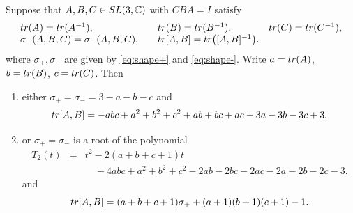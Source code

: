 \documentclass[10pt,a4paper]{amsart}
\begin{document}
\begin{theorem}\label{thm:branch-fact}
Suppose that $A,B,C\in{\rm SL}(3,{\mathbb C})$ with $CBA=I$ satisfy
$$
\begin{array}{lll}
{\rm tr}(A)={\rm tr}(A^{-1}),\quad & {\rm tr}(B)={\rm tr}(B^{-1}),\quad &{\rm tr}(C)={\rm tr}(C^{-1}),\\
\sigma_+(A,B,C)=\sigma_-(A,B,C),\quad & {\rm tr}[A,B]={\rm tr}\bigl([A,B]^{-1}\bigr). &
\end{array}
$$
where $\sigma_+,\sigma_-$ are given by \eqref{eq:shape+} and \eqref{eq:shape-}. 
Write $a={\rm tr}(A)$, $b={\rm tr}(B)$, $c={\rm tr}(C)$. Then 
\begin{enumerate}
\item[(1)] either $\sigma_+=\sigma_- = 3-a-b-c$
and
$$
{\rm tr}[A,B] = -abc+a^2+b^2+c^2+ab+bc+ac -3a-3b-3c+3.
$$
\item[(2)] or $\sigma_+=\sigma_-$ is a root of the polynomial
\begin{eqnarray*}
T_2(t) & = & t^2-2(a+b+c+1)t \\
&& \quad -4abc+a^2+b^2+c^2-2ab-2bc-2ac-2a-2b-2c-3.
\end{eqnarray*}
and
$$
{\rm tr}[A,B] = (a+b+c+1)\sigma_++(a+1)(b+1)(c+1)-1.
$$
\end{enumerate}
\end{theorem}
\end{document}
